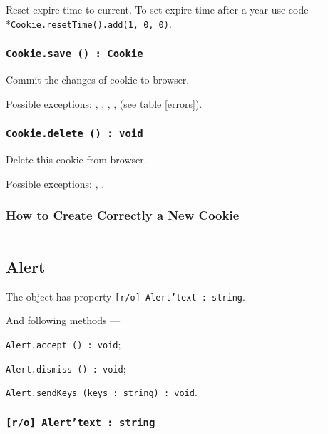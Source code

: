 Reset expire time to current. To set expire time after a year use code —\\*\texttt{Cookie.resetTime().add(1, 0, 0)}.

\subsubsection{\texttt{Cookie.save () : Cookie}}

Commit the changes of cookie to browser.

Possible exceptions: , , , ,  (see table \ref{errors}).

\subsubsection{\texttt{Cookie.delete () : void}}

Delete this cookie from browser.

Possible exceptions: , .

\subsubsection{How to Create Correctly a New Cookie}

\inputminted[linenos]{icl}{../sources/newcookies.icL}


\subsection{Alert}

The object \alert{} has property \texttt{[r/o] Alert'text : string}.

And following methods —
\begin{icItems}
	\item \texttt{Alert.accept () : void};
	\item \texttt{Alert.dismiss () : void};
	\item \texttt{Alert.sendKeys (keys : string) : void}.
\end{icItems}

\subsubsection{\texttt{[r/o] Alert'text : string}}

